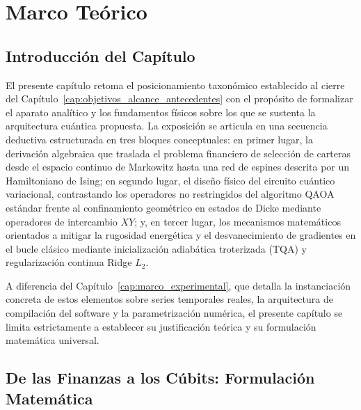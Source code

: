 \chapter{Marco Teórico}
\label{cap:marco_teorico}

\section{Introducción del Capítulo}
\label{sec:intro_marco_teorico}

El presente capítulo retoma el posicionamiento taxonómico establecido al cierre del Capítulo~\ref{cap:objetivos_alcance_antecedentes} con el propósito de formalizar el aparato analítico y los fundamentos físicos sobre los que se sustenta la arquitectura cuántica propuesta. La exposición se articula en una secuencia deductiva estructurada en tres bloques conceptuales: en primer lugar, la derivación algebraica que traslada el problema financiero de selección de carteras desde el espacio continuo de Markowitz hasta una red de espines descrita por un Hamiltoniano de Ising; en segundo lugar, el diseño físico del circuito cuántico variacional, contrastando los operadores no restringidos del algoritmo QAOA estándar frente al confinamiento geométrico en estados de Dicke mediante operadores de intercambio $XY$; y, en tercer lugar, los mecanismos matemáticos orientados a mitigar la rugosidad energética y el desvanecimiento de gradientes en el bucle clásico mediante inicialización adiabática troterizada (TQA) y regularización continua Ridge $L_2$.

A diferencia del Capítulo~\ref{cap:marco_experimental}, que detalla la instanciación concreta de estos elementos sobre series temporales reales, la arquitectura de compilación del software y la parametrización numérica, el presente capítulo se limita estrictamente a establecer su justificación teórica y su formulación matemática universal.

\section{De las Finanzas a los Cúbits: Formulación Matemática}
\label{sec:formulacion_matematica}

